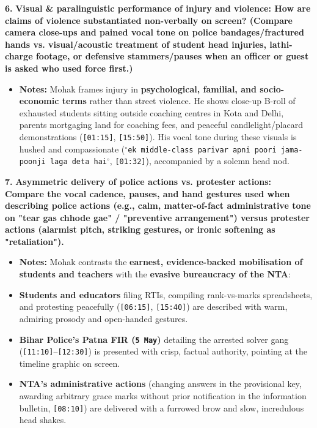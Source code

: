 \documentclass[10pt,a4paper]{article}
\begin{document}
\noindent\textbf{6.} \textbf{Visual \& paralinguistic performance of injury and violence: How are claims of violence substantiated non-verbally on screen? (Compare camera close-ups and pained vocal tone on police bandages/fractured hands vs. visual/acoustic treatment of student head injuries, lathi-charge footage, or defensive stammers/pauses when an officer or guest is asked who used force first.)}\par\smallskip
\begin{itemize}
  \item \textbf{Notes:}
Mohak frames injury in \textbf{psychological, familial, and socio-economic terms} rather than street violence. He shows close-up B-roll of exhausted students sitting outside coaching centres in Kota and Delhi, parents mortgaging land for coaching fees, and peaceful candlelight/placard demonstrations (\texttt{[01:15]}, \texttt{[15:50]}). His vocal tone during these visuals is hushed and compassionate (\texttt{$^\circ$ek middle-class parivar apni poori jama-poonji laga deta hai$^\circ$}, \texttt{[01:32]}), accompanied by a solemn head nod.\par\smallskip
\end{itemize}

\noindent\textbf{7.} \textbf{Asymmetric delivery of police actions vs. protester actions: Compare the vocal cadence, pauses, and hand gestures used when describing police actions (e.g., calm, matter-of-fact administrative tone on "tear gas chhode gae" / "preventive arrangement") versus protester actions (alarmist pitch, striking gestures, or ironic softening as "retaliation").}\par\smallskip
\begin{itemize}
  \item \textbf{Notes:}
Mohak contrasts the \textbf{earnest, evidence-backed mobilisation of students and teachers} with the \textbf{evasive bureaucracy of the NTA}:\par\smallskip
  \item \textbf{Students and educators} filing RTIs, compiling rank-vs-marks spreadsheets, and protesting peacefully (\texttt{[06:15]}, \texttt{[15:40]}) are described with warm, admiring prosody and open-handed gestures.
  \item \textbf{Bihar Police's Patna FIR (\texttt{5 May})} detailing the arrested solver gang (\texttt{[11:10]}--\texttt{[12:30]}) is presented with crisp, factual authority, pointing at the timeline graphic on screen.
  \item \textbf{NTA's administrative actions} (changing answers in the provisional key, awarding arbitrary grace marks without prior notification in the information bulletin, \texttt{[08:10]}) are delivered with a furrowed brow and slow, incredulous head shakes.
\end{itemize}
\end{document}

